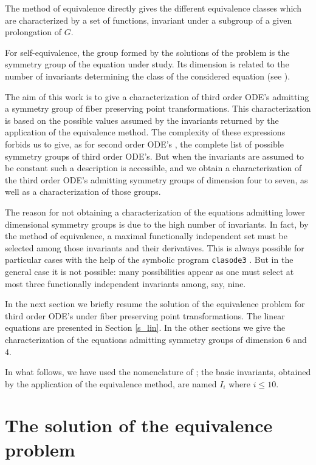 The method of equivalence directly gives the different equivalence classes 
which are characterized by a set of functions, invariant under a subgroup 
of a given prolongation of $G$. 
 
For self-equivalence, the group formed by the solutions 
of the problem is the symmetry group of the equation under study. Its 
dimension is related to the 
number of invariants determining the class of the considered equation 
(see \cite{P_Kamran89}).

The aim of this work is to give a characterization of third order 
ODE's admitting a symmetry group of fiber preserving point transformations.
This characterization is based on the possible values assumed by the 
invariants returned by the application of the equivalence method. 
The complexity of these expressions forbids us to give, as for second order 
ODE's \cite{P_HsuKam89}, 
the complete list of possible symmetry groups of third order ODE's. 
But when the invariants are assumed to be constant such a 
description is accessible, and we obtain a characterization of the 
third order ODE's admitting symmetry groups of dimension four to seven, as
well as a characterization of those groups.

The reason for not obtaining a characterization of the equations admitting 
lower dimensional symmetry groups is due to the high number of invariants. 
In fact, by the method of equivalence, a maximal functionally 
independent set must be selected among those invariants and their derivatives. 
This is always possible for 
particular cases with the help of the symbolic program {\tt clasode3} 
\cite{P_Grebot95}. But in the general case it is not possible: many 
possibilities appear as one must select at most three functionally 
independent invariants among, say, nine.

In the next section we briefly resume the solution of the 
equivalence problem for third order ODE's under fiber preserving point 
transformations. The linear equations are presented in 
Section \ref{s_lin}. In the other sections we give the characterization 
of the equations admitting symmetry groups of dimension 6 and 4.

In what follows, we have used the nomenclature of \cite{T_Grebot94}; the 
basic invariants, obtained by the application of the 
equivalence method, are named $I_{i}$ where $i \leq 10$. 


\section{The solution of the equivalence problem}

